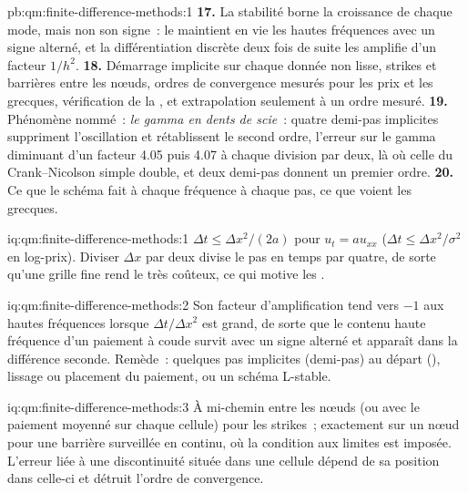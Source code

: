 \begin{solution}{pb:qm:finite-difference-methods:1}
\textbf{17.} La stabilité borne la croissance de chaque mode, mais non son signe~: le  maintient en vie les hautes fréquences avec un signe alterné, et la différentiation discrète deux fois de suite les amplifie d'un facteur $1/h^2$.
\textbf{18.} Démarrage implicite sur chaque donnée non lisse, strikes et barrières entre les nœuds, ordres de convergence mesurés pour les prix et les grecques, vérification de la , et extrapolation seulement à un ordre mesuré.
\textbf{19.} Phénomène nommé~: \emph{le gamma en dents de scie}~: quatre demi-pas implicites suppriment l'oscillation et rétablissent le second ordre, l'erreur sur le gamma diminuant d'un facteur 4.05 puis 4.07 à chaque division par deux, là où celle du Crank--Nicolson simple
double, et deux demi-pas donnent un premier ordre.
\textbf{20.} Ce que le schéma fait à chaque fréquence à chaque pas, ce que voient les grecques.
\end{solution}

\begin{solution}{iq:qm:finite-difference-methods:1}
$\Delta t \le \Delta x^2/(2a)$ pour $u_t = au_{xx}$ ($\Delta t \le \Delta x^2/\sigma^2$ en log-prix). Diviser $\Delta x$ par deux divise le pas en temps par quatre, de sorte qu'une grille fine rend le  très coûteux, ce qui motive les
.
\end{solution}

\begin{solution}{iq:qm:finite-difference-methods:2}
Son facteur d'amplification tend vers $-1$ aux hautes fréquences lorsque $\Delta t/\Delta x^2$ est grand, de sorte que le contenu haute fréquence d'un paiement à coude survit avec un signe alterné et apparaît dans la
différence seconde. Remède~: quelques pas implicites (demi-pas) au départ (), lissage ou placement du paiement, ou un schéma L-stable.
\end{solution}

\begin{solution}{iq:qm:finite-difference-methods:3}
À mi-chemin entre les nœuds (ou avec le paiement moyenné sur chaque cellule) pour les strikes~; exactement sur un nœud pour une barrière surveillée en continu, où la condition aux limites est imposée. L'erreur liée à une
discontinuité située dans une cellule dépend de sa position dans celle-ci et détruit l'ordre de convergence.
\end{solution}

